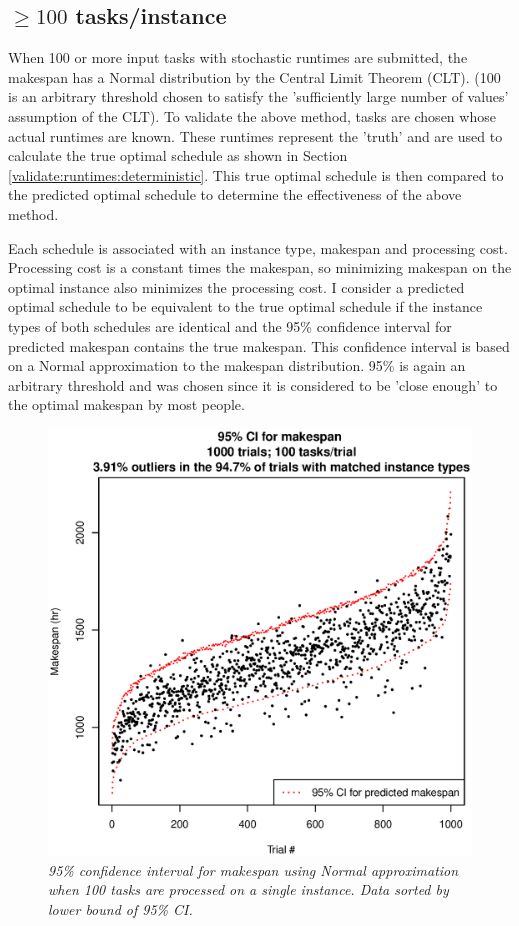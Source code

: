 \documentclass[12pt]{report}
\begin{document}
\subsection{$\geq 100$ tasks/instance}

When 100 or more input tasks with stochastic runtimes are submitted, the makespan has a Normal distribution by the Central Limit Theorem (CLT).
(100 is an arbitrary threshold chosen to satisfy the 'sufficiently large number of values' assumption of the CLT).
To validate the above method, tasks are chosen whose actual runtimes are known.
These runtimes represent the 'truth' and are used to calculate the true optimal schedule as shown in Section \ref{validate:runtimes:deterministic}. 
This true optimal schedule is then compared to the predicted optimal schedule to determine the effectiveness of the above method. 

Each schedule is associated with an instance type, makespan and processing cost. 
Processing cost is a constant times the makespan, so minimizing makespan on the optimal instance also minimizes the processing cost.
I consider a predicted optimal schedule to be equivalent to the true optimal schedule if the instance types of both schedules are identical and the 95\% confidence interval for predicted makespan contains the true makespan.
This confidence interval is based on a Normal approximation to the makespan distribution.
95\% is again an arbitrary threshold and was chosen since it is considered to be 'close enough' to the optimal makespan by most people.

\begin{figure}
\includegraphics[width=1\textwidth]{validate-stochastic-runtimes-1000-trials-100-tasks.eps}
\caption{\textit{95\% confidence interval for makespan using Normal approximation when 100 tasks are processed on a single instance. Data sorted by lower bound of 95\% CI.}}
\label{fig:validate-stochastic-runtimes-1000-trials-100-tasks}
\end{figure}
\end{document}
